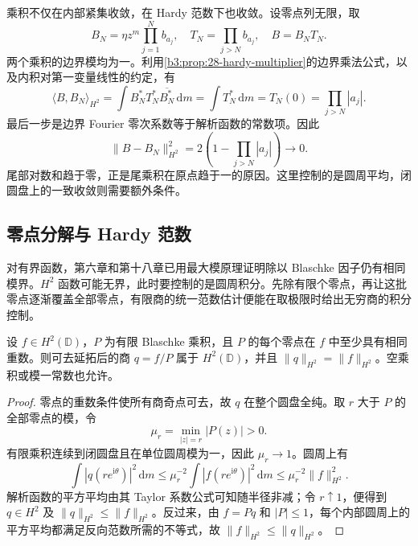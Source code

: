 乘积不仅在内部紧集收敛，在 Hardy 范数下也收敛。设零点列无限，取
\[
 B_N=\eta z^m\prod_{j=1}^N b_{a_j},
 \quad T_N=\prod_{j>N}b_{a_j},
 \quad B=B_NT_N.
\]
两个乘积的边界模均为一。利用\cref{b3:prop:28-hardy-multiplier}的边界乘法公式，以及内积对第一变量线性的约定，有
\[
 \langle B,B_N\rangle_{H^2}
 =\int B_N^*T_N^*\overline{B_N^*}\,\mathrm dm
 =\int T_N^*\,\mathrm dm=T_N(0)=\prod_{j>N}|a_j|.
\]
最后一步是边界 Fourier 零次系数等于解析函数的常数项。因此
\begin{equation}\label{b3:eq:28-blaschke-hardy-convergence}
 \|B-B_N\|_{H^2}^2
 =2\left(1-\prod_{j>N}|a_j|\right)\longrightarrow0.
\end{equation}
尾部对数和趋于零，正是尾乘积在原点趋于一的原因。这里控制的是圆周平均，闭圆盘上的一致收敛则需要额外条件。

\subsection{零点分解与 Hardy 范数}
\label{b3:subsec:280303}

对有界函数，第六章和第十八章已用最大模原理证明除以 Blaschke 因子仍有相同模界。\(H^2\) 函数可能无界，此时要控制的是圆周积分。先除有限个零点，再让这批零点逐渐覆盖全部零点，有限商的统一范数估计便能在取极限时给出无穷商的积分控制。

\begin{lemma}[有限零点的等范数除法]\label{b3:lem:28-finite-blaschke-division}
设 \(f\in H^2(\mathbb D)\)，\(P\) 为有限 Blaschke 乘积，且 \(P\) 的每个零点在 \(f\) 中至少具有相同重数。则可去延拓后的商 \(q=f/P\) 属于 \(H^2(\mathbb D)\)，并且 \(\|q\|_{H^2}=\|f\|_{H^2}\)。空乘积或模一常数也允许。
\end{lemma}
\begin{proof}
零点的重数条件使所有商奇点可去，故 \(q\) 在整个圆盘全纯。取 \(r\) 大于 \(P\) 的全部零点的模，令
\[
 \mu_r=\min_{|z|=r}|P(z)|>0.
\]
有限乘积连续到闭圆盘且在单位圆周模为一，因此 \(\mu_r\to1\)。圆周上有
\[
 \int|q(re^{\mathrm i\theta})|^2\,\mathrm dm
 \le\mu_r^{-2}\int|f(re^{\mathrm i\theta})|^2\,\mathrm dm
 \le\mu_r^{-2}\|f\|_{H^2}^2.
\]
解析函数的平方平均由其 Taylor 系数公式可知随半径非减；令 \(r\uparrow1\)，便得到 \(q\in H^2\) 及 \(\|q\|_{H^2}\le\|f\|_{H^2}\)。反过来，由 \(f=Pq\) 和 \(|P|\le1\)，每个内部圆周上的平方平均都满足反向范数所需的不等式，故 \(\|f\|_{H^2}\le\|q\|_{H^2}\)。
\end{proof}

